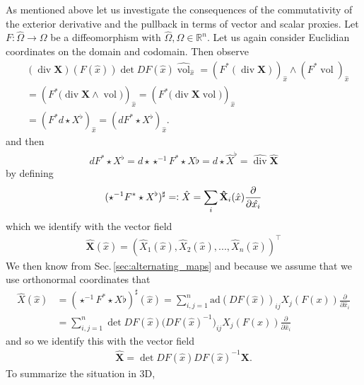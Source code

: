 \documentclass[12pt,a4paper]{article}
\numberwithin{equation}{subsection}
\numberwithin{lemma}{subsection}
\theoremstyle{definition}
\DeclareMathOperator{\diver}{div}
\DeclareMathOperator{\vol}{vol}
\newcommand{\real}{\mathbb{R}}
\begin{document}
As mentioned above let us investigate the consequences of the 
commutativity of the exterior derivative and the pullback in terms 
of vector and scalar proxies.
Let $F: \widehat{\Omega} \rightarrow \Omega$ be a diffeomorphism with 
$\widehat{\Omega}, \Omega \in \real^n$. Let us again consider Euclidian 
coordinates on the domain and codomain. Then observe
\begin{align*}
    & (\diver \mathbf{X})(F(\hat{x}))  \det DF(\hat{x}) \widehat{\vol}_{\hat{x}} 
    = ( F^* (\diver \mathbf{X}))_{\hat{x}} \wedge (F^* \vol)_{\hat{x}}
    \\ &= \left( F^* \big( \diver \mathbf{X} \wedge \vol \big) \right)_{\hat{x}}
    =  \left( F^* \big( \diver \mathbf{X} \vol \big) \right)_{\hat{x}}
    \\ &= \left( F^* d \star X^\flat  \right)_{\hat{x}}
    = \left( d F^* \star X^\flat  \right)_{\hat{x}}.
\end{align*}
and then 
\begin{align*}
    d F^* \star X^\flat = d \star \star^{-1} F^* \star X\flat 
    = d \star \hat{X}^\flat = \widehat{\diver} \mathbf{\widehat{X}}
\end{align*}
by defining 
\begin{align*}
    ( \star^{-1} F^* \star X^\flat)^\sharp 
    =\vcentcolon \hat{X} = \sum_i \mathbf{\hat{X}}_i(\hat{x})  
     \frac{\partial}{\partial \hat{x_i}}
\end{align*}
which we identify with the vector field
\begin{align*}
    \mathbf{\widehat{X}}(\hat{x}) 
    = (\widehat{X}_1(\hat{x}), \widehat{X}_2(\hat{x})
        , ..., \widehat{X}_n(\hat{x}) )^\top
\end{align*}
We then know from Sec.\,\ref{sec:alternating_maps} and because we assume
that we use orthonormal coordinates that 
\begin{align*}
    \hat{X}(\hat{x}) 
    &= ( \star^{-1} F^* \star X\flat)^\sharp (\hat{x})
    = \sum_{i,j=1}^n \text{ad}(DF(\hat{x}))_{ij} X_j(F(x)) 
        \frac{\partial}{\partial \hat{x}_i}
    \\ &= \sum_{i,j=1}^n \det DF(\hat{x}) \big( DF(\hat{x})^{-1}\big)_{ij} X_j(F(x)) 
        \frac{\partial}{\partial \hat{x}_i}
\end{align*}
and so we identify this with the vector field
\begin{align*}
    \mathbf{\widehat{X}} = \det DF(\hat{x}) DF(\hat {x})^{-1} \mathbf{X}.
\end{align*}
To summarize the situation in 3D,
\end{document}
